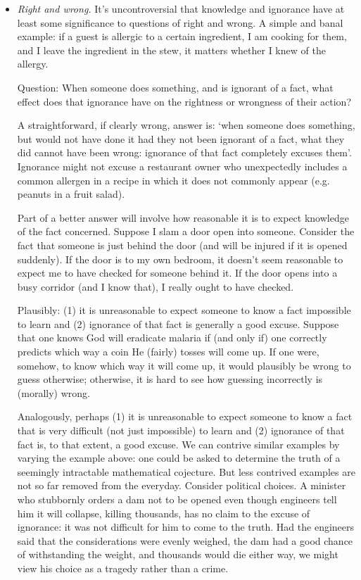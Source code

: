 \begin{itemize}
    \item \emph{Right and wrong.} It’s uncontroversial that knowledge and ignorance have at least some significance to questions of right and wrong. A simple and banal example: if a guest is allergic to a certain ingredient, I am cooking for them, and I leave the ingredient in the stew, it matters whether I knew of the allergy.
    
    Question: When someone does something, and is ignorant of a fact, what effect does that ignorance have on the rightness or wrongness of their action?

    A straightforward, if clearly wrong, answer is: ‘when someone does something, but would not have done it had they not been ignorant of a fact, what they did cannot have been wrong: ignorance of that fact completely excuses them’. Ignorance might not excuse a restaurant owner who unexpectedly includes a common allergen in a recipe in which it does not commonly appear (e.g. peanuts in a fruit salad).

    Part of a better answer will involve how reasonable it is to expect knowledge of the fact concerned. Suppose I slam a door open into someone. Consider the fact that someone is just behind the door (and will be injured if it is opened suddenly). If the door is to my own bedroom, it doesn’t seem reasonable to expect me to have checked for someone behind it. If the door opens into a busy corridor (and I know that), I really ought to have checked.

    Plausibly: (1) it is unreasonable to expect someone to know a fact impossible to learn and (2) ignorance of that fact is generally a good excuse. Suppose that one knows God will eradicate malaria if (and only if) one correctly predicts which way a coin He (fairly) tosses will come up. If one were, somehow, to know which way it will come up, it would plausibly be wrong to guess otherwise; otherwise, it is hard to see how guessing incorrectly is (morally) wrong.

    Analogously, perhaps (1) it is unreasonable to expect someone to know a fact that is very difficult (not just impossible) to learn and (2) ignorance of that fact is, to that extent, a good excuse. We can contrive similar examples by varying the example above: one could be asked to determine the truth of a seemingly intractable mathematical cojecture. But less contrived examples are not so far removed from the everyday. Consider political choices. A minister who stubbornly orders a dam not to be opened even though engineers tell him it will collapse, killing thousands, has no claim to the excuse of ignorance: it was not difficult for him to come to the truth. Had the engineers said that the considerations were evenly weighed, the dam had a good chance of withstanding the weight, and thousands would die either way, we might view his choice as a tragedy rather than a crime.
    

\end{itemize}
